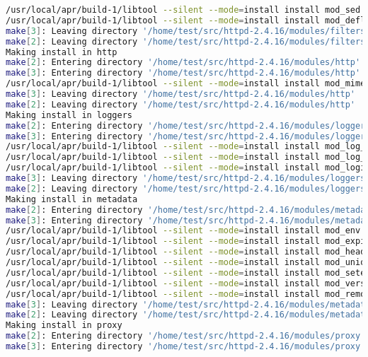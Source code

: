 \begin{lstlisting}[language=bash]
/usr/local/apr/build-1/libtool --silent --mode=install install mod_sed.la /usr/local/apache2/modules/
/usr/local/apr/build-1/libtool --silent --mode=install install mod_deflate.la /usr/local/apache2/modules/
make[3]: Leaving directory '/home/test/src/httpd-2.4.16/modules/filters'
make[2]: Leaving directory '/home/test/src/httpd-2.4.16/modules/filters'
Making install in http
make[2]: Entering directory '/home/test/src/httpd-2.4.16/modules/http'
make[3]: Entering directory '/home/test/src/httpd-2.4.16/modules/http'
/usr/local/apr/build-1/libtool --silent --mode=install install mod_mime.la /usr/local/apache2/modules/
make[3]: Leaving directory '/home/test/src/httpd-2.4.16/modules/http'
make[2]: Leaving directory '/home/test/src/httpd-2.4.16/modules/http'
Making install in loggers
make[2]: Entering directory '/home/test/src/httpd-2.4.16/modules/loggers'
make[3]: Entering directory '/home/test/src/httpd-2.4.16/modules/loggers'
/usr/local/apr/build-1/libtool --silent --mode=install install mod_log_config.la /usr/local/apache2/modules/
/usr/local/apr/build-1/libtool --silent --mode=install install mod_log_debug.la /usr/local/apache2/modules/
/usr/local/apr/build-1/libtool --silent --mode=install install mod_logio.la /usr/local/apache2/modules/
make[3]: Leaving directory '/home/test/src/httpd-2.4.16/modules/loggers'
make[2]: Leaving directory '/home/test/src/httpd-2.4.16/modules/loggers'
Making install in metadata
make[2]: Entering directory '/home/test/src/httpd-2.4.16/modules/metadata'
make[3]: Entering directory '/home/test/src/httpd-2.4.16/modules/metadata'
/usr/local/apr/build-1/libtool --silent --mode=install install mod_env.la /usr/local/apache2/modules/
/usr/local/apr/build-1/libtool --silent --mode=install install mod_expires.la /usr/local/apache2/modules/
/usr/local/apr/build-1/libtool --silent --mode=install install mod_headers.la /usr/local/apache2/modules/
/usr/local/apr/build-1/libtool --silent --mode=install install mod_unique_id.la /usr/local/apache2/modules/
/usr/local/apr/build-1/libtool --silent --mode=install install mod_setenvif.la /usr/local/apache2/modules/
/usr/local/apr/build-1/libtool --silent --mode=install install mod_version.la /usr/local/apache2/modules/
/usr/local/apr/build-1/libtool --silent --mode=install install mod_remoteip.la /usr/local/apache2/modules/
make[3]: Leaving directory '/home/test/src/httpd-2.4.16/modules/metadata'
make[2]: Leaving directory '/home/test/src/httpd-2.4.16/modules/metadata'
Making install in proxy
make[2]: Entering directory '/home/test/src/httpd-2.4.16/modules/proxy'
make[3]: Entering directory '/home/test/src/httpd-2.4.16/modules/proxy'

\end{lstlisting}
